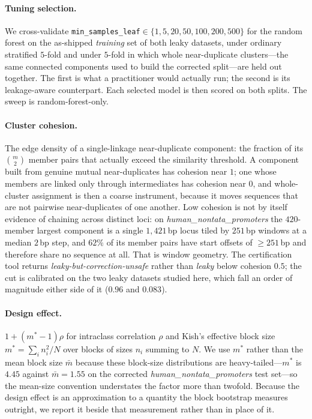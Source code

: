 \documentclass[11pt,a4paper]{article}
\begin{document}
\paragraph{Tuning selection.} We cross-validate
\texttt{min\_samples\_leaf}$\in\{1,5,20,50,100,200,500\}$ for the random forest on the as-shipped
\emph{training} set of both leaky datasets, under ordinary stratified $5$-fold and under $5$-fold in
which whole near-duplicate clusters---the same connected components used to build the corrected
split---are held out together. The first is what a practitioner would actually run; the second is
its leakage-aware counterpart. Each selected model is then scored on both splits. The sweep is
random-forest-only.

\paragraph{Cluster cohesion.} The edge density of a single-linkage near-duplicate component: the
fraction of its $\binom{m}{2}$ member pairs that actually exceed the similarity threshold. A
component built from genuine mutual near-duplicates has cohesion near $1$; one whose members are
linked only through intermediates has cohesion near $0$, and whole-cluster assignment is then a
coarse instrument, because it moves sequences that are not pairwise near-duplicates of one another.
Low cohesion is not by itself evidence of chaining across distinct loci: on
\textit{human\_nontata\_promoters} the $420$-member largest component is a single $1{,}421$\,bp
locus tiled by $251$\,bp windows at a median $2$\,bp step, and $62\%$ of its member pairs have start
offsets of $\ge251$\,bp and therefore share no sequence at all. That is window geometry. The
certification tool returns \emph{leaky-but-correction-unsafe} rather than \emph{leaky} below
cohesion $0.5$; the cut is calibrated on the two leaky datasets studied here, which fall an order of
magnitude either side of it ($0.96$ and $0.083$).

\paragraph{Design effect.} $1+(m^{*}-1)\rho$ for intraclass correlation $\rho$ and Kish's effective
block size $m^{*}=\sum_i n_i^{2}/N$ over blocks of sizes $n_i$ summing to $N$. We use $m^{*}$ rather
than the mean block size $\bar m$ because these block-size distributions are heavy-tailed---$m^{*}$
is $4.45$ against $\bar m=1.55$ on the corrected \textit{human\_nontata\_promoters} test set---so the
mean-size convention understates the factor more than twofold. Because the design effect is an
approximation to a quantity the block bootstrap measures outright, we report it beside that
measurement rather than in place of it.
\end{document}
